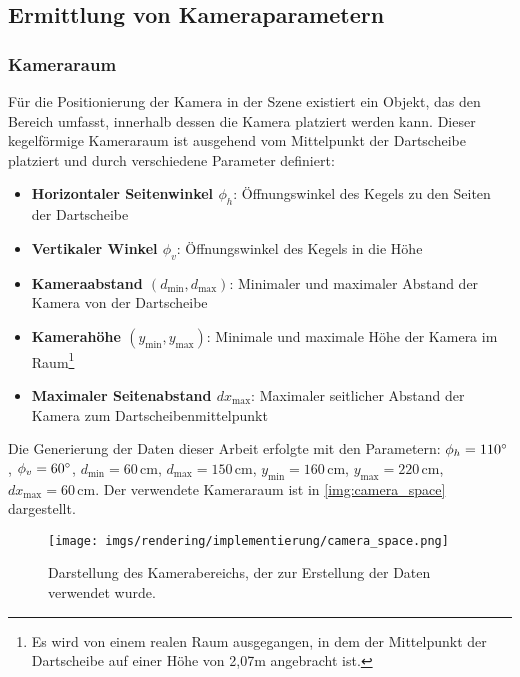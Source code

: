 \subsection{Ermittlung von Kameraparametern}  %
\label{sec:ermittlung_kameraparamater}

\subsubsection{Kameraraum}

Für die Positionierung der Kamera in der Szene existiert ein Objekt, das den Bereich umfasst, innerhalb dessen die Kamera platziert werden kann. Dieser kegelförmige Kameraraum ist ausgehend vom Mittelpunkt der Dartscheibe platziert und durch verschiedene Parameter definiert:

\begin{itemize}
    \item \textbf{Horizontaler Seitenwinkel $\phi_h$}: Öffnungswinkel des Kegels zu den Seiten der Dartscheibe
    \item \textbf{Vertikaler Winkel $\phi_v$}: Öffnungswinkel des Kegels in die Höhe
    \item \textbf{Kameraabstand $\left(d_\text{min}, d_\text{max}\right)$}: Minimaler und maximaler Abstand der Kamera von der Dartscheibe
    \item \textbf{Kamerahöhe $\left(y_\text{min}, y_\text{max}\right)$}: Minimale und maximale Höhe der Kamera im Raum\footnote{Es wird von einem realen Raum ausgegangen, in dem der Mittelpunkt der Dartscheibe auf einer Höhe von 2,07m angebracht ist.}
    \item \textbf{Maximaler Seitenabstand $dx_\text{max}$}: Maximaler seitlicher Abstand der Kamera zum Dartscheibenmittelpunkt
\end{itemize}

Die Generierung der Daten dieser Arbeit erfolgte mit den Parametern: $\phi_h = 110^{\circ}$, $\phi_v = 60^{\circ}$, $d_\text{min} = 60\,\text{cm}$, $d_\text{max} = 150\,\text{cm}$, $y_\text{min} = 160\,\text{cm}$, $y_\text{max} = 220\,\text{cm}$, $dx_\text{max} = 60\,\text{cm}$. Der verwendete Kameraraum ist in \autoref{img:camera_space} dargestellt.

\begin{figure}
    \centering
    \texttt{[image: imgs/rendering/implementierung/camera\_space.png]}
    \caption{Darstellung des Kamerabereichs, der zur Erstellung der Daten verwendet wurde.}
    \label{img:camera_space}
\end{figure}

